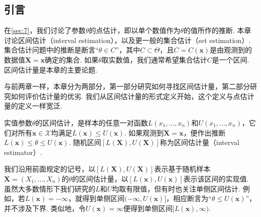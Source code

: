 \subsection{引言}\label{sec:9.1}
在\autoref{sec:7}，我们讨论了参数$\theta$的点估计，即以单个数值作为$\theta$的值所作的推断. 本章讨论区间估计（interval estimation），以及更一般的集合估计（set estimation）. 集合估计问题中的推断是断言“$\theta\in C$”，其中$C\subset\Theta$，且$C=C(\boldsymbol x)$是由观测到的数据值$\boldsymbol X=\boldsymbol x$确定的集合. 如果$\theta$取实数值，我们通常希望集合估计$C$是一个区间. 区间估计量是本章的主要论题.

与前两章一样，本章分为两部分，第一部分研究如何寻找区间估计量，第二部分研究如何评价估计量的优劣. 我们从区间估计量的形式定义开始，这个定义与点估计量的定义一样宽泛.
\begin{definition}\label{def:9.1.1}
实值参数$\theta$的区间估计，是样本的任意一对函数$L(x_1,\ldots,x_n)$和$U(x_1,\ldots,x_n)$，它们对所有$\boldsymbol x\in\mathcal X$均满足$L(\boldsymbol x)\le U(\boldsymbol x)$. 如果观测到$\boldsymbol X=\boldsymbol x$，便作出推断$L(\boldsymbol x)\le\theta\le U(\boldsymbol x)$. 随机区间$[L(\boldsymbol X),U(\boldsymbol X)]$称为区间估计量（interval estimator）.
\end{definition}
我们沿用前面规定的记号，以$[L(\boldsymbol X),U(\boldsymbol X)]$表示基于随机样本$\boldsymbol X=(X_1,\ldots,X_n)$的$\theta$的区间估计量，以$[L(\boldsymbol x),U(\boldsymbol x)]$表示该区间的实现值. 虽然大多数情形下我们研究的$L$和$U$均取有限值，但有时也关注单侧区间估计. 例如，若$L(\boldsymbol x)=-\infty$，就得到单侧区间$(-\infty,U(\boldsymbol x)]$，相应断言为“$\theta\le U(\boldsymbol x)$”，并不涉及下界. 类似地，令$U(\boldsymbol x)=\infty$便得到单侧区间$[L(\boldsymbol x),\infty)$.

